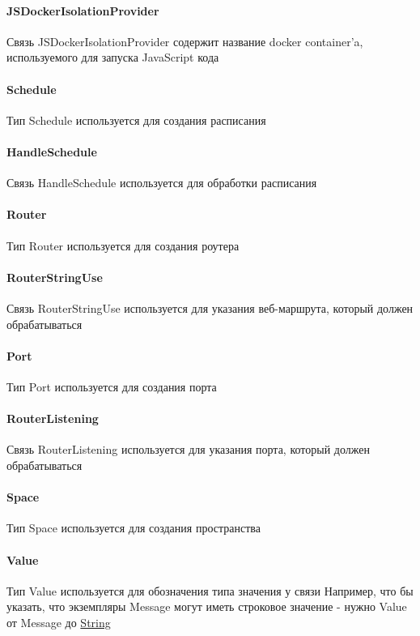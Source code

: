 \paragraph*{JSDockerIsolationProvider}\hypertarget{Core.JSDockerIsolationProvider.Description}{}
Связь JSDockerIsolationProvider содержит название docker container'a,
используемого для запуска JavaScript кода
\paragraph*{Schedule}\hypertarget{Core.Schedule.Description}{}
Тип Schedule используется для создания расписания
\paragraph*{HandleSchedule}\hypertarget{Core.HandleSchedule.Description}{}
Связь HandleSchedule используется для обработки расписания
\paragraph*{Router}\hypertarget{Core.Router.Description}{}
Тип Router используется для создания роутера
\paragraph*{RouterStringUse}\hypertarget{Core.RouterStringUse.Description}{}
Связь RouterStringUse используется для
указания веб-маршрута, который должен обрабатываться
\paragraph*{Port}\hypertarget{Core.Port.Description}{}
Тип Port используется для создания порта
\paragraph*{RouterListening}\hypertarget{Core.RouterListening.Description}{}
Связь RouterListening используется для
указания порта, который должен обрабатываться
\paragraph*{Space}\hypertarget{Core.Space.Description}{}
Тип Space используется для создания пространства
\paragraph*{Value}\hypertarget{Core.Value.Description}{}
Тип Value используется для обозначения типа значения у связи
Например, что бы указать, что экземпляры Message могут иметь строковое значение - нужно Value от Message до \hyperlink{Core.String.Description}{String}
